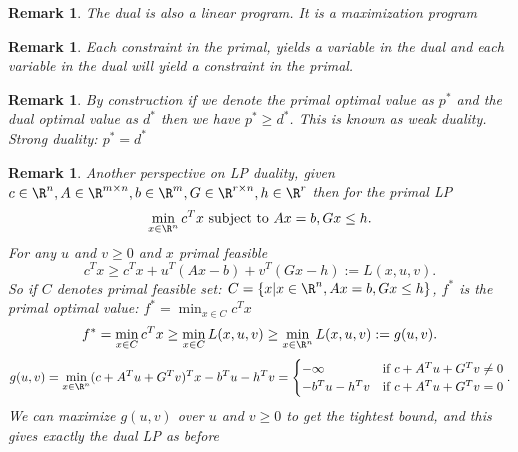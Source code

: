 \documentclass[a4paper]{article}
\newtheorem{rmk}[thm]{Remark}
\begin{document}
\begin{rmk}
    The dual is also a linear program. It is a maximization program 
\end{rmk}
\begin{rmk}
    Each constraint in the primal, yields a variable in the dual and each variable in the dual will yield a constraint in the primal. 
\end{rmk}
\begin{rmk}
    By construction if we denote the primal optimal value as $p^*$ and the dual optimal value as $d^*$ then we have $p^*\geq d^*$. This is known as weak duality. \\
    Strong duality: $p^*=d^*$
\end{rmk}
\begin{rmk}
    Another perspective on LP duality, given $c\in \R^n, A\in \R^{m\times n},b\in \R^m,G\in \R^{r\times n},h\in \R^r$ then for the primal LP 
    \[
    \min_{x\in \R^n} c^T x \text{ subject to } Ax=b, Gx\leq h 
    .\] 
    For any $u$ and $v\geq 0$ and $x$ primal feasible
    \[
    c^T x\geq c^T x+u^T (Ax-b)+v^T(Gx-h):=L(x,u,v)
    .\] 
    So if $C$ denotes primal feasible set: $C= \{x | x\in \R^n, Ax=b, Gx\leq h\}$, $f^*$ is the primal optimal value: $f^*=\min_{x\in C}c^T x$ 
    \[
    f^*=\min_{x\in C}c^Tx\geq \min_{x\in C}L(x,u,v)\geq \min_{x\in \R^n}L(x,u,v):=g(u,v)
    .\]
    \[
    g(u,v)=\min_{x\in \R^n}(c+A^Tu+G^Tv)^Tx-b^Tu-h^Tv= \begin{cases}
        -\infty & \text{if } c+A^Tu+G^Tv\neq 0 \\
        -b^Tu-h^Tv & \text{if } c+A^Tu+G^Tv= 0
    \end{cases}
    .\]  
    We can maximize $g(u,v)$ over $u$ and $v\geq 0$ to get the tightest bound, and this gives exactly the dual LP as before 
\end{rmk}
\end{document}
